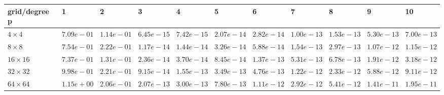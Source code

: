 \begin{tabular}{lllllllllll}
\hline
 grid/degree p   & 1          & 2          & 3          & 4          & 5          & 6          & 7          & 8          & 9          & 10         \\
\hline
 $4 \times 4$    & $7.09e-01$ & $1.14e-01$ & $6.45e-15$ & $7.42e-15$ & $2.07e-14$ & $2.82e-14$ & $1.00e-13$ & $1.53e-13$ & $5.30e-13$ & $7.00e-13$ \\
 $8 \times 8$    & $7.54e-01$ & $2.22e-01$ & $1.17e-14$ & $1.44e-14$ & $3.26e-14$ & $5.88e-14$ & $1.54e-13$ & $2.97e-13$ & $1.07e-12$ & $1.15e-12$ \\
 $16 \times 16$  & $7.37e-01$ & $1.31e-01$ & $2.36e-14$ & $3.70e-14$ & $8.45e-14$ & $1.37e-13$ & $5.31e-13$ & $6.78e-13$ & $1.91e-12$ & $3.18e-12$ \\
 $32 \times 32$  & $9.98e-01$ & $2.21e-01$ & $9.15e-14$ & $1.55e-13$ & $3.49e-13$ & $4.76e-13$ & $1.22e-12$ & $2.33e-12$ & $5.88e-12$ & $9.11e-12$ \\
 $64 \times 64$  & $1.15e+00$ & $2.06e-01$ & $2.07e-13$ & $3.00e-13$ & $7.80e-13$ & $1.11e-12$ & $2.92e-12$ & $5.41e-12$ & $1.41e-11$ & $1.95e-11$ \\
\hline
\end{tabular}